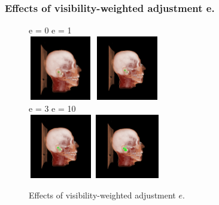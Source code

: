 \documentclass{beamer}
\begin{document}
\begin{frame}
\frametitle{Effects of visibility-weighted adjustment e. }
\begin{figure}
\centering
e = 0    \hspace{50pt}      e = 1 \\
\vspace{3pt}
\includegraphics[width=80pt,height=80pt]{i=0.png}
\includegraphics[width=80pt,height=80pt]{i=1.png}\\
e = 3    \hspace{50pt}      e = 10 \\
\vspace{3pt}
\includegraphics[width=80pt,height=80pt]{i=3.png}
\includegraphics[width=80pt,height=80pt]{i=10.png}
\caption{Effects of visibility-weighted adjustment $e$. }
\end{figure}
\end{frame}
\end{document}
